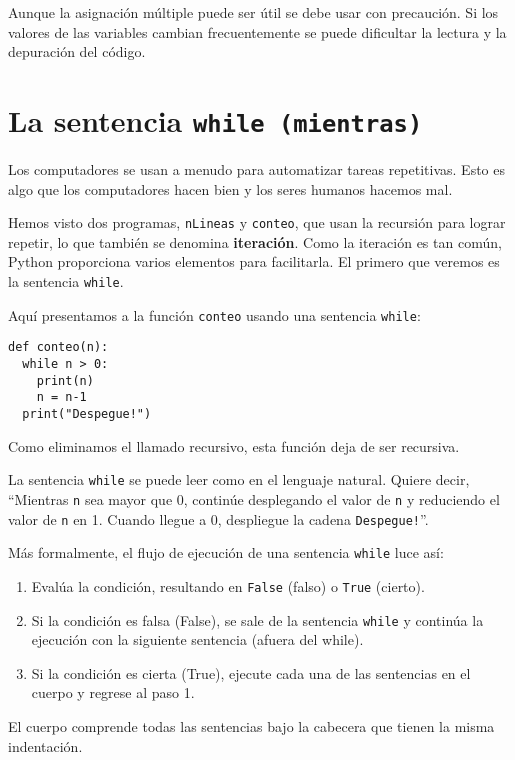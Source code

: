 Aunque la asignación múltiple puede ser útil se debe usar con precaución.
Si los valores de las variables cambian frecuentemente se puede dificultar
la lectura y la depuración del código.

\section{La sentencia \texttt{while (mientras)} }

  

Los computadores se usan a menudo para automatizar tareas repetitivas.
Esto es algo que los computadores hacen bien y los seres humanos hacemos
mal.

Hemos visto dos programas, \texttt{nLineas} y \texttt{conteo}, que
usan la recursión para lograr repetir, lo que también se denomina
\textbf{iteración}. Como la iteración es tan común, Python proporciona
varios elementos para facilitarla. El primero que veremos es la sentencia
\texttt{while}.

Aquí presentamos a la función \texttt{conteo} usando una sentencia
\texttt{while}:

\begin{lstlisting}
def conteo(n):
  while n > 0:
    print(n)
    n = n-1
  print("Despegue!")
\end{lstlisting}
 Como eliminamos el llamado recursivo, esta función deja de ser recursiva.

La sentencia \texttt{while} se puede leer como en el lenguaje natural.
Quiere decir, ``Mientras \texttt{n} sea mayor que 0, continúe desplegando
el valor de \texttt{n} y reduciendo el valor de \texttt{n} en 1. Cuando
llegue a 0, despliegue la cadena \texttt{Despegue!}''.

Más formalmente, el flujo de ejecución de una sentencia \texttt{while}
luce así:
\begin{enumerate}
\item Evalúa la condición, resultando en \texttt{False} (falso) o \texttt{True}
(cierto).
\item Si la condición es falsa (False), se sale de la sentencia \texttt{while}
y continúa la ejecución con la siguiente sentencia (afuera del while).
\item Si la condición es cierta (True), ejecute cada una de las sentencias
en el cuerpo y regrese al paso 1.
\end{enumerate}
El cuerpo comprende todas las sentencias bajo la cabecera que tienen
la misma indentación.

